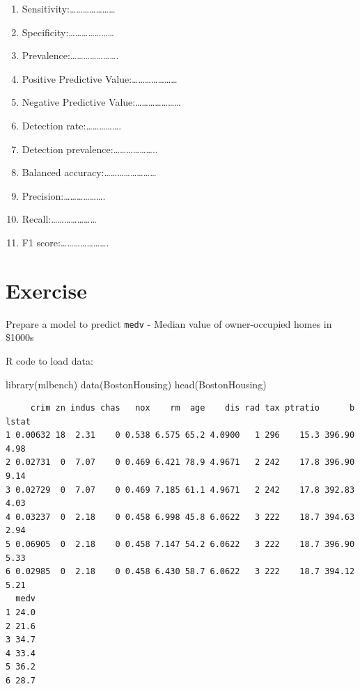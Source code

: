 \documentclass[
  letterpaper,
  DIV=11,
  numbers=noendperiod]{scrreprt}
\newenvironment{Shaded}{\begin{snugshade}}{\end{snugshade}}
\newcommand{\FunctionTok}[1]{\textcolor[rgb]{0.28,0.35,0.67}{#1}}
\newcommand{\NormalTok}[1]{\textcolor[rgb]{0.00,0.23,0.31}{#1}}
\begin{document}
\begin{enumerate}
\def\labelenumi{\arabic{enumi}.}
\item
  Sensitivity:\ldots\ldots\ldots\ldots\ldots\ldots\ldots{}
\item
  Specificity:\ldots\ldots\ldots\ldots\ldots\ldots\ldots{}
\item
  Prevalence:\ldots\ldots\ldots\ldots\ldots\ldots\ldots.
\item
  Positive Predictive Value:\ldots\ldots\ldots\ldots\ldots\ldots\ldots{}
\item
  Negative Predictive Value:\ldots\ldots\ldots\ldots\ldots\ldots\ldots{}
\item
  Detection rate:\ldots\ldots\ldots\ldots\ldots.
\item
  Detection prevalence:\ldots\ldots\ldots\ldots\ldots\ldots..
\item
  Balanced accuracy:\ldots\ldots\ldots\ldots\ldots\ldots\ldots\ldots{}
\item
  Precision:\ldots\ldots\ldots\ldots\ldots\ldots.
\item
  Recall:\ldots\ldots\ldots\ldots\ldots\ldots\ldots{}
\item
  F1 score:\ldots\ldots\ldots\ldots\ldots\ldots\ldots.
\end{enumerate}

\section{Exercise}\label{exercise-4}

Prepare a model to predict \texttt{medv} - Median value of
owner-occupied homes in \$1000s

R code to load data:

\begin{Shaded}
\begin{Highlighting}[]
\FunctionTok{library}\NormalTok{(mlbench)}
\FunctionTok{data}\NormalTok{(BostonHousing)}
\FunctionTok{head}\NormalTok{(BostonHousing)}
\end{Highlighting}
\end{Shaded}

\begin{verbatim}
     crim zn indus chas   nox    rm  age    dis rad tax ptratio      b lstat
1 0.00632 18  2.31    0 0.538 6.575 65.2 4.0900   1 296    15.3 396.90  4.98
2 0.02731  0  7.07    0 0.469 6.421 78.9 4.9671   2 242    17.8 396.90  9.14
3 0.02729  0  7.07    0 0.469 7.185 61.1 4.9671   2 242    17.8 392.83  4.03
4 0.03237  0  2.18    0 0.458 6.998 45.8 6.0622   3 222    18.7 394.63  2.94
5 0.06905  0  2.18    0 0.458 7.147 54.2 6.0622   3 222    18.7 396.90  5.33
6 0.02985  0  2.18    0 0.458 6.430 58.7 6.0622   3 222    18.7 394.12  5.21
  medv
1 24.0
2 21.6
3 34.7
4 33.4
5 36.2
6 28.7
\end{verbatim}
\end{document}
